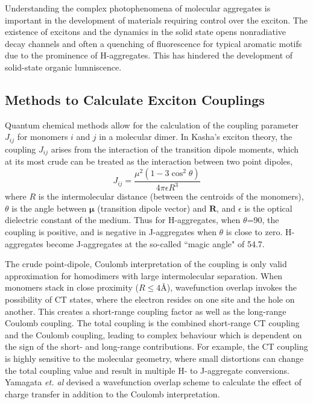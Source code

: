 Understanding the complex photophenomena of molecular aggregates is important in the development of materials requiring control over the exciton. The existence of excitons and the dynamics in the solid state opens nonradiative decay channels and often a quenching of fluorescence for typical aromatic motifs due to the prominence of H-aggregates. This has hindered the development of solid-state organic lumniscence. 

\subsection{Methods to Calculate Exciton Couplings}\label{section: lom exciton_couplings}
Quantum chemical methods allow for the calculation of the coupling parameter $J_{ij}$ for monomers $i$ and $j$ in a molecular dimer. In Kasha's exciton theory, the coupling $J_{ij}$ arises from the interaction of the transition dipole moments, which at its most crude can be treated as the interaction between two point dipoles,
\begin{equation}\label{equation: PDA}
    J_{ij}=\frac{\mu^{2}(1-3\cos^{2}\theta)}{4\pi\epsilon{}R^3}
\end{equation}
where $R$ is the intermolecular distance (between the centroids of the monomers), $\theta$ is the angle between  $\bm{\mu}$ (transition dipole vector) and $\bm{R}$, and $\epsilon$ is the optical dielectric constant of the medium. Thus for H-aggregates, when $\theta$=90\degree{}, the coupling is positive, and is negative in J-aggregates when $\theta$ is close to zero. H-aggregates become J-aggregates at the so-called ``magic angle" of 54.7\textdegree.\cite{Hestand2018}

The crude point-dipole, Coulomb interpretation of the coupling is only valid approximation for homodimers with large intermolecular separation.\cite{Kistler2013} When monomers stack in close proximity ($R\leq4\si{\angstrom}$), wavefunction overlap invokes the possibility of \ac{CT} states, where the electron resides on one site and the hole on another.\cite{Darghouth2018} This creates a short-range coupling factor as well as the long-range Coulomb coupling. The total coupling is the combined short-range \ac{CT} coupling and the Coulomb coupling, leading to complex behaviour which is dependent on the sign of the short- and long-range contributions. For example, the \ac{CT} coupling is highly sensitive to the molecular geometry, where small distortions can change the total coupling value and result in multiple H- to J-aggregate conversions.\cite{Arago2015} Yamagata \textit{et. al} devised a wavefunction overlap scheme to calculate the effect of charge transfer in addition to  the Coulomb interpretation.\cite{Yamagata2012} %

